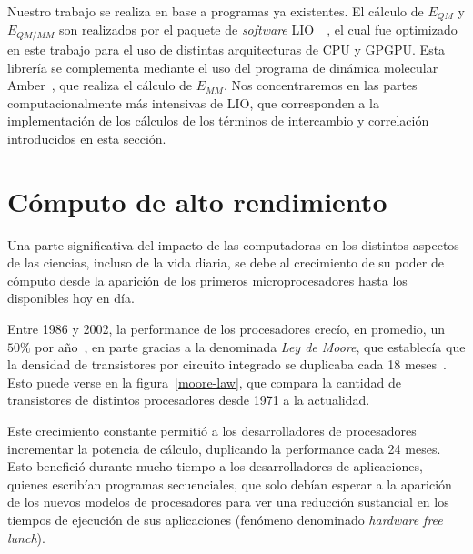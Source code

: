 Nuestro trabajo se realiza en base a programas ya existentes. El c\'alculo de $E_{QM}$ y $E_{QM/MM}$ son realizados por el paquete de
\textit{software} LIO~\cite{LIO}~\cite{TesisNitsche}, el cual fue optimizado en este trabajo para el uso de
distintas arquitecturas de CPU y GPGPU. Esta librer\'ia
se complementa mediante el uso del programa de din\'amica molecular Amber~\cite{Amber}, que realiza el c\'alculo
de $E_{MM}$. Nos concentraremos en las partes computacionalmente m\'as intensivas de LIO, que corresponden a la
implementaci\'on de los c\'alculos de los t\'erminos de intercambio y correlaci\'on introducidos en esta secci\'on.

\section{C\'omputo de alto rendimiento}

Una parte significativa del impacto de las computadoras en los distintos aspectos de las ciencias, incluso de la vida diaria, se debe al crecimiento de su poder de c\'omputo desde la aparici\'on de los primeros microprocesadores hasta los disponibles hoy en d\'ia.

Entre 1986 y 2002, la performance de los procesadores crec\'io, en promedio, un $50\%$ por a\~no~\cite{Pacheco}, en parte gracias a la denominada \textit{Ley de Moore}, que
establec\'ia que la densidad de transistores por circuito integrado se duplicaba cada 18 meses~\cite{HennessyPatterson}. 
Esto puede verse en la figura~\ref{moore-law}, que compara la cantidad de transistores de distintos procesadores desde 1971 a la actualidad.

Este crecimiento constante permiti\'o a los desarrolladores de procesadores incrementar la potencia de c\'alculo, duplicando la performance cada 24 meses. 
Esto benefici\'o durante mucho tiempo a los desarrolladores de aplicaciones, quienes escrib\'ian programas secuenciales, que solo deb\'ian esperar a la aparici\'on de los nuevos modelos de procesadores para ver una reducci\'on sustancial en los tiempos de ejecuci\'on de sus aplicaciones (fen\'omeno denominado \textit{hardware free lunch}).

